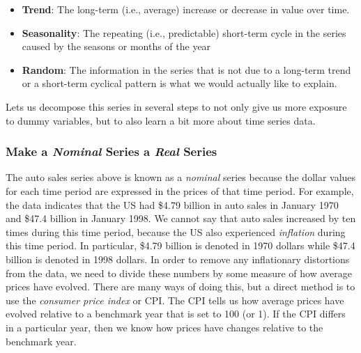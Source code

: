 \documentclass[
]{book}
\begin{document}
\begin{itemize}
\item
  \textbf{Trend}: The long-term (i.e., average) increase or decrease in value over time.
\item
  \textbf{Seasonality}: The repeating (i.e., predictable) short-term cycle in the series caused by the seasons or months of the year
\item
  \textbf{Random}: The information in the series that is not due to a long-term trend or a short-term cyclical pattern is what we would actually like to explain.
\end{itemize}

Lets us decompose this series in several steps to not only give us more exposure to dummy variables, but to also learn a bit more about time series data.

\hypertarget{make-a-nominal-series-a-real-series}{%
\subsubsection*{\texorpdfstring{Make a \emph{Nominal} Series a \emph{Real} Series}{Make a Nominal Series a Real Series}}\label{make-a-nominal-series-a-real-series}}

The auto sales series above is known as a \emph{nominal} series because the dollar values for each time period are expressed in the prices of that time period. For example, the data indicates that the US had \$4.79 billion in auto sales in January 1970 and \$47.4 billion in January 1998. We cannot say that auto sales increased by ten times during this time period, because the US also experienced \emph{inflation} during this time period. In particular, \$4.79 billion is denoted in 1970 dollars while \$47.4 billion is denoted in 1998 dollars. In order to remove any inflationary distortions from the data, we need to divide these numbers by some measure of how average prices have evolved. There are many ways of doing this, but a direct method is to use the \emph{consumer price index} or CPI. The CPI tells us how average prices have evolved relative to a benchmark year that is set to 100 (or 1). If the CPI differs in a particular year, then we know how prices have changes relative to the benchmark year.
\end{document}

